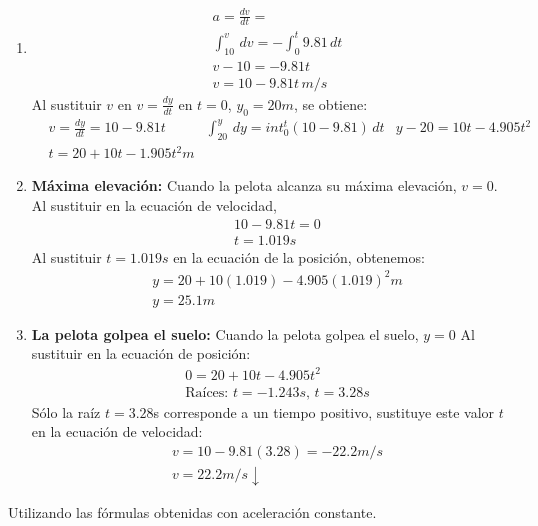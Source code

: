 \begin{enumerate}
    \item \begin{align*}
        &a=\frac{dv}{dt}=\\
        &\int_{10}^v\, dv=-\int_0^t 9.81\, dt\\
        &v-10=-9.81t\\
        &v=10-9.81t\, m/s
    \end{align*}
    Al sustituir $v$ en $v=\frac{dy}{dt}$ en $t=0$, $y_0=20m$, se obtiene:
    \begin{align*}
        &v=\frac{dy}{dt}=10-9.81t
        &\int_{20}^{y}\,dy=int_0^t\left(10-9.81\right)\, dt
        &y-20=10t-4.905t^2\\ 
        &t=20+10t-1.905t^2m
    \end{align*}
    \item \textbf{Máxima elevación:} Cuando la pelota alcanza su máxima elevación, $v=0$. Al sustituir en la ecuación de velocidad, 
    \begin{align*}
        &10-9.81t=0\\
        &t=1.019s
    \end{align*}
    Al sustituir $t=1.019s$ en la ecuación de la posición, obtenemos:
    \begin{align*}
        &y=20+10(1.019)-4.905(1.019)^2m\\
        &y=25.1m
    \end{align*}
    \item \textbf{La pelota golpea el suelo:} Cuando la pelota golpea el suelo, $y=0$ Al sustituir en la ecuación de posición: 
    \begin{align*}
        &0=20+10t-4.905t^2\\
        &\text{Raíces: }t=-1.243s,\, t=3.28s 
    \end{align*}
    Sólo la raíz $t=3.28$s corresponde a un tiempo positivo, sustituye este valor $t$ en la ecuación de velocidad: 
    \begin{align*}
        &v=10-9.81(3.28)=-22.2m/s\\
        &v=22.2m/s\downarrow
    \end{align*} 
\end{enumerate}

Utilizando las fórmulas obtenidas con aceleración constante. 

